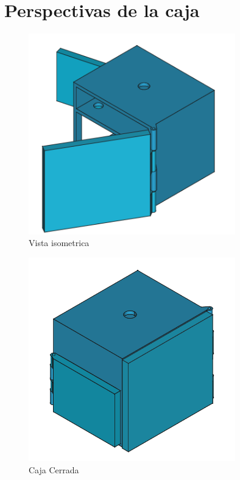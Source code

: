 \section{Perspectivas de la caja}\label{sec:anexo_caja}

\begin{figure}[H]
	\centering
	\includegraphics[width=0.8\textwidth]{images/4-DesarrolloTeorico/4-1-caja/CAJA_3D_ISOMETRICA_2.png}
	\caption{Vista isometrica}
\end{figure}

\begin{figure}[H]
	\centering
	\includegraphics[width=0.8\textwidth]{images/4-DesarrolloTeorico/4-1-caja/CAJA_3D_CERRADA.png}
	\caption{Caja Cerrada}
\end{figure}


